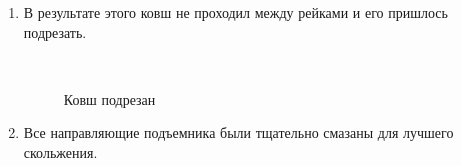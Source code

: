 \begin{enumerate}
	\item В результате этого ковш не проходил между рейками и его пришлось подрезать.
	\begin{figure}[H]
		\begin{minipage}[h]{0.2\linewidth}
			\center  
		\end{minipage}
		\begin{minipage}[h]{0.6\linewidth}
			\caption{Ковш подрезан}
		\end{minipage}
	\end{figure}
	
	\item Все направляющие подъемника были тщательно смазаны для лучшего скольжения.
	

\end{enumerate}
